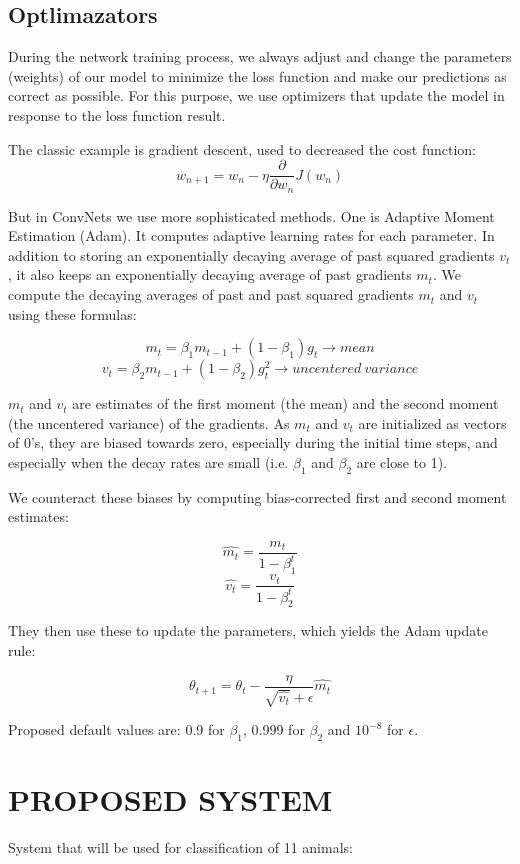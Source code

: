 \documentclass[conference]{IEEEtran}
\begin{document}
\subsection{Optlimazators}
During the network training process, we always adjust and change the parameters (weights) of our model to minimize the loss function and make our predictions as correct as possible. For this purpose, we use optimizers that update the model in response to the loss function result.

The classic example is gradient descent, used to decreased the cost function:
$$w_{n+1} = w_{n} - \eta \frac{\partial}{\partial w_{n}}J(w_{n})$$

But in ConvNets we use more sophisticated methods. One is Adaptive Moment Estimation (Adam). It computes adaptive learning rates for each parameter. In addition to storing an exponentially decaying average of past squared gradients $v_{t}$, it also keeps an exponentially decaying average of past gradients $m_{t}$. We compute the decaying averages of past and past squared gradients $m_{t}$ and $v_{t}$ using these formulas:

$$m_{t}=\beta_{1}m_{t-1}+\left(1-\beta_{1}\right)g_{t} \rightarrow mean$$
$$v_{t}=\beta_{2}m_{t-1}+\left(1-\beta_{2}\right)g_{t}^2 \rightarrow uncentered \: variance$$

$m_{t}$ and $v_{t}$ are estimates of the first moment (the mean) and the second moment (the uncentered variance) of the gradients. As $m_{t}$ and $v_{t}$ are initialized as vectors of 0's, they are biased towards zero, especially during the initial time steps, and especially when the decay rates are small (i.e. $\beta_{1}$ and $\beta_{2}$ are close to 1).

We counteract these biases by computing bias-corrected first and second moment estimates:

$$\widehat{m_{t}}=\frac{m_{t}}{1-\beta_{1}^t}$$
$$\widehat{v_{t}}=\frac{v_{t}}{1-\beta_{2}^t}$$

They then use these to update the parameters, which yields the Adam update rule:

$$\theta_{t+1}=\theta_{t}-\frac{\eta}{\sqrt{\widehat{v_{t}}}+\epsilon}\widehat{m_{t}}$$

Proposed default values are: 0.9 for $\beta_{1}$, 0.999 for $\beta_{2}$ and $10^{-8}$ for $\epsilon$.

\section{PROPOSED SYSTEM}
System that will be used for classification of 11 animals:
\end{document}
